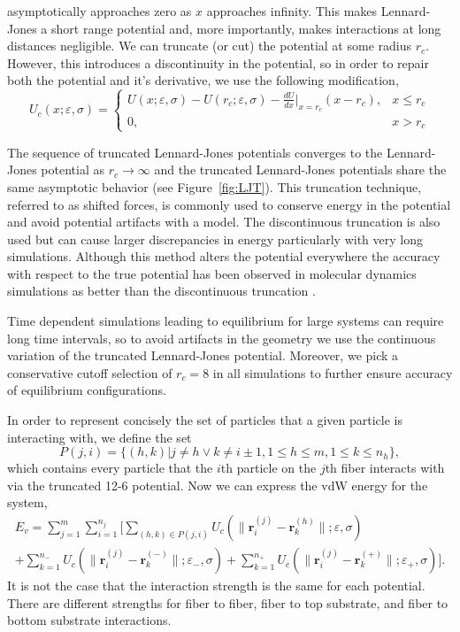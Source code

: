 \noindent	
asymptotically approaches zero as $x$ approaches infinity. This makes Lennard-Jones a short range potential and, more importantly, makes interactions at long distances negligible. We can truncate (or cut) the potential at some radius $r_c$. However, this introduces a discontinuity in the potential, so in order to repair both the potential and it's derivative, we use the following modification,
\begin{equation}
	U_c(x; \varepsilon, \sigma) = \left\{ 
		\begin{array}{lr}
			U(x; \varepsilon, \sigma) - U(r_c; \varepsilon, \sigma) - \frac{dU}{dx}\bigg|_{x = r_c}(x - r_c), & x \leq r_c\\
			0, & x > r_c
		\end{array}
		\right. 
\end{equation}

	The sequence of truncated Lennard-Jones potentials converges to the Lennard-Jones potential as $r_c \to \infty$ and the truncated Lennard-Jones potentials share the same asymptotic behavior (see Figure~\ref{fig:LJT}). This truncation technique, referred to as shifted forces, is commonly used to conserve energy in the potential and avoid potential artifacts with a model. The discontinuous truncation is also used but can cause larger discrepancies in energy particularly with very long simulations. Although this method alters the potential everywhere the accuracy with respect to the true potential has been observed in molecular dynamics simulations as better than the discontinuous truncation \cite{Toxvaerd2011}.
	
  Time dependent simulations leading to equilibrium for large systems can require long time intervals, so to avoid artifacts in the geometry we use the continuous variation of the truncated Lennard-Jones potential. Moreover, we pick a conservative cutoff selection of $r_c = 8$ in all simulations to further ensure accuracy of equilibrium configurations.

	In order to represent concisely the set of particles that a given particle is interacting with, we define the set
\begin{equation}
	P(j,i) = \{ (h,k)|j \neq h \vee k \neq i \pm 1, 1 \leq h \leq m, 1 \leq k \leq n_h \},
\end{equation}
which contains every particle that the $i$th particle on the $j$th fiber interacts with via the truncated 12-6 potential. Now we can express the vdW energy for the system,
\begin{multline}
	E_v = \sum_{j=1}^m \sum_{i=1}^{n_j} \bigg[ \sum_{(h,k) \in P(j,i)} U_c \left( \| \textbf{r}_i^{(j)} - \textbf{r}_k^{(h)} \|; \varepsilon, \sigma \right) \\ + \sum_{k=1}^{n_-} U_c \left( \| \textbf{r}_i^{(j)} - \textbf{r}_k^{(-)} \|; \varepsilon_-, \sigma \right) + \sum_{k=1}^{n_+} U_c \left( \| \textbf{r}_i^{(j)} - \textbf{r}_k^{(+)} \|; \varepsilon_+, \sigma \right) \bigg].
\end{multline}
It is not the case that the interaction strength is the same for each potential. There are different strengths for fiber to fiber, fiber to top substrate, and fiber to bottom substrate interactions.

